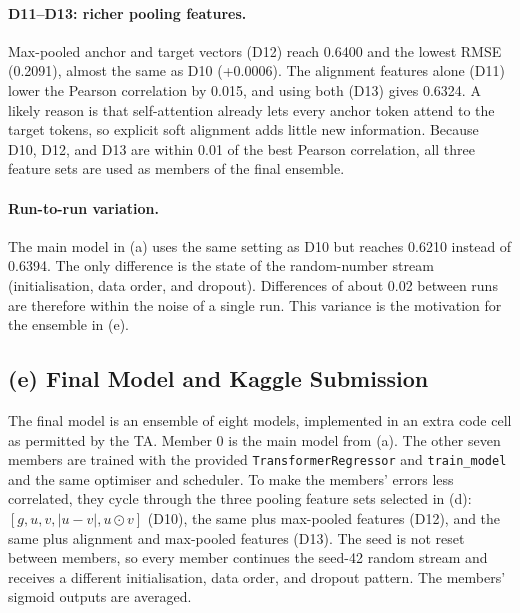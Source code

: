 \documentclass[11pt,a4paper]{article}
\begin{document}
\paragraph{D11--D13: richer pooling features.}
Max-pooled anchor and target vectors (D12) reach 0.6400 and the lowest
RMSE (0.2091), almost the same as D10 (+0.0006). The alignment features
alone (D11) lower the Pearson correlation by 0.015, and using both
(D13) gives 0.6324. A likely reason is that self-attention already lets
every anchor token attend to the target tokens, so explicit soft
alignment adds little new information.
Because D10, D12, and D13 are within 0.01 of the best Pearson
correlation, all three feature sets are used as members of the final
ensemble.

\paragraph{Run-to-run variation.}
The main model in (a) uses the same setting as D10 but reaches 0.6210
instead of 0.6394. The only difference is the state of the random-number
stream (initialisation, data order, and dropout). Differences of about
0.02 between runs are therefore within the noise of a single run. This
variance is the motivation for the ensemble in (e).


\subsection{(e) Final Model and Kaggle Submission}

The final model is an ensemble of eight models, implemented in an extra
code cell as permitted by the TA. Member 0 is the main model from (a).
The other seven members are trained with the provided
\texttt{TransformerRegressor} and \texttt{train\_model} and the same
optimiser and scheduler. To make the members' errors less correlated,
they cycle through the three pooling feature sets selected in (d):
$[g,u,v,|u-v|,u\odot v]$ (D10), the same plus max-pooled features (D12),
and the same plus alignment and max-pooled features (D13). The seed is
not reset between members, so every member continues the seed-42 random
stream and receives a different initialisation, data order, and dropout
pattern. The members' sigmoid outputs are averaged.
\end{document}
